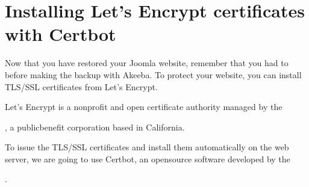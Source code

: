 \documentclass[a4paper,10pt,english,openany,oneside]{sphinxmanual}
\begin{document}
\begin{sloppypar}
\begin{enumerate}
\begin{quote}
\begin{figure}[H]
\centering

\noindent{}
\end{figure}
\end{quote}

\end{enumerate}


\section{Installing Let’s Encrypt certificates with Certbot}
\label{\detokenize{joomla-to-vps:installing-let-s-encrypt-certificates-with-certbot}}
\sphinxAtStartPar
Now that you have restored your Joomla website, remember that you had to {\hyperref[\detokenize{joomla-to-vps:disable-ssl}]{}} before making the backup with Akeeba.
To protect your website, you can install TLS/SSL certificates from Let’s Encrypt.

\sphinxAtStartPar
Let’s Encrypt is a non\sphinxhyphen{}profit and open certificate authority managed by the %
\begin{footnote}[11]\sphinxAtStartFootnote
{}
%
\end{footnote}, a public\sphinxhyphen{}benefit corporation based in California.

\sphinxAtStartPar
To issue the TLS/SSL certificates and install them automatically on the web server, we are going to use Certbot, an open\sphinxhyphen{}source software developed by the %
\begin{footnote}[12]\sphinxAtStartFootnote
{}
%
\end{footnote}.

\begin{figure}[H]
\centering
\capstart


\end{figure}
\end{sloppypar}
\end{document}
